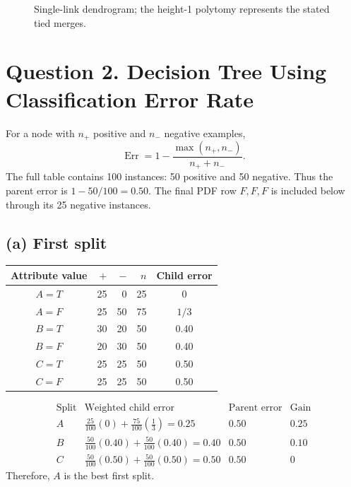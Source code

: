 \documentclass[11pt,a4paper]{article}
\begin{document}
\begin{figure}[H]
\centering
{}
\caption{Single-link dendrogram; the height-1 polytomy represents the stated tied merges.}
\label{fig:agglomerative-dendrogram}
\end{figure}

\section*{Question 2. Decision Tree Using Classification Error Rate}
For a node with \(n_+\) positive and \(n_-\) negative examples,
\[
\operatorname{Err}=1-\frac{\max(n_+,n_-)}{n_++n_-}.
\]
The full table contains 100 instances: 50 positive and 50 negative. Thus the parent error is \(1-50/100=0.50\). The final PDF row \(F,F,F\) is included below through its 25 negative instances.

\subsection*{(a) First split}
\begin{center}
\small
\begin{tabular}{c|r r|r|c}
\toprule
Attribute value & \(+\) & \(-\) & \(n\) & Child error\\
\midrule
\(A=T\) & 25&0&25&0\\
\(A=F\) & 25&50&75&\(1/3\)\\
\(B=T\) & 30&20&50&0.40\\
\(B=F\) & 20&30&50&0.40\\
\(C=T\) & 25&25&50&0.50\\
\(C=F\) & 25&25&50&0.50\\
\bottomrule
\end{tabular}
\end{center}
\[
\begin{array}{c|c|c|c}
\text{Split}&\text{Weighted child error}&\text{Parent error}&\text{Gain}\\ \hline
A&\frac{25}{100}(0)+\frac{75}{100}\left(\frac13\right)=0.25&0.50&0.25\\
B&\frac{50}{100}(0.40)+\frac{50}{100}(0.40)=0.40&0.50&0.10\\
C&\frac{50}{100}(0.50)+\frac{50}{100}(0.50)=0.50&0.50&0
\end{array}
\]
Therefore, \(A\) is the best first split.
\end{document}
